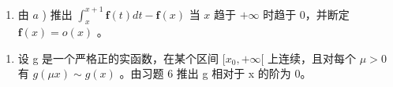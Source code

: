 \begin{enumerate}
\def\labelenumi{\alph{enumi})}
\setcounter{enumi}{1}
\tightlist
\item
  由 \(a\) ) 推出 \(\int_{x}^{x + 1}\mathbf{f}(t)dt - \mathbf{f}(x)\) 当 \(x\) 趋于 \(+\infty\) 时趋于 0，并断定 \(\mathbf{f}(x) = o(x)\) 。
\end{enumerate}

\begin{enumerate}
\def\labelenumi{\arabic{enumi})}
\setcounter{enumi}{6}
\tightlist
\item
  设 g 是一个严格正的实函数，在某个区间 \([x_{0}, +\infty[\) 上连续，且对每个 \(\mu > 0\) 有 \(g(\mu x) \sim g(x)\) 。由习题 6 推出 g 相对于 x 的阶为 0。
\end{enumerate}

\setcounter{exercisegroup}{3}
